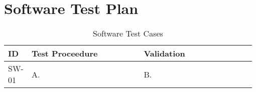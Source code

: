 

\setcounter{section}{4}
\section{Software Test Plan}
\bigskip


\bigskip
\bgroup
\def\arraystretch{1.25}
\begin{table}[h!]
    \centering
    \begin{tabular}{|p{0.075\linewidth}|p{0.45\linewidth}|p{0.45\linewidth}|} 
    \hline
    ID & Test Proceedure & Validation\\ 
    
    \hline
    SW-01
    & A.  
    & B. \\ 
    \hline    





    \hline
    \end{tabular}
    \caption{Software Test Cases}
\end{table}